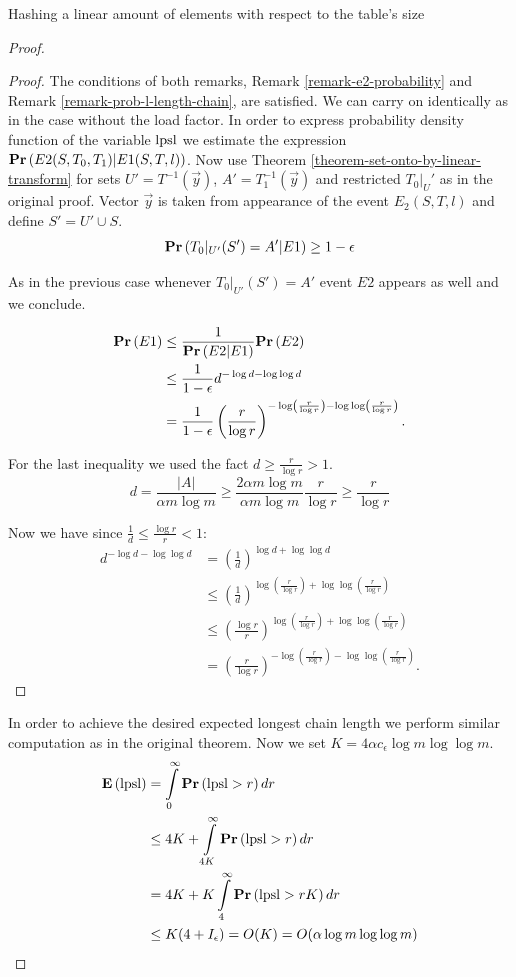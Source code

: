 \begin{section}{Hashing a linear amount of elements with respect to the table's size}
\begin{proof}
\begin{proof}
The conditions of both remarks, Remark \ref{remark-e2-probability} and Remark \ref{remark-prob-l-length-chain}, are satisfied. We can carry on identically as in the case without the load factor. In order to express probability density function of the variable $\mathrm{lpsl}$ we estimate the expression $\mathbf{Pr}\left(E2(S, T_0, T_1)|E1(S, T, l)\right)$. Now use Theorem \ref{theorem-set-onto-by-linear-transform} for sets $U' = T^{-1}(\vec{y})$, $A' = T_1^{-1}(\vec{y})$ and restricted $T_0|_U'$ as in the original proof. Vector $\vec{y}$ is taken from appearance of the event $E_2(S, T, l)$ and define $S' = U' \cup S$.
\[
	\mathbf{Pr}\left(T_0|_{U'}(S') = A' | E1\right) \geq 1 - \epsilon
\]

As in the previous case whenever $T_0|_{U'}(S') = A'$ event $E2$ appears as well and we conclude.

\[
\begin{split}
\mathbf{Pr}\left(E1\right) 
	& \leq \frac{1}{\mathbf{Pr}\left(E2|E1\right)}{\mathbf{Pr}\left(E2\right)} \\
	& \leq \frac{1}{1 - \epsilon} d ^ {-\log d - \log \log d} \\
	& = \frac{1}{1 - \epsilon} \left(\frac{r}{\log r}\right)^{-\log \left(\frac{r}{\log r}\right) - \log \log \left(\frac{r}{\log r}\right)} \text{.}
\end{split}
\]

For the last inequality we used the fact $d \geq \frac{r}{\log r} > 1$.
\[
	d = \frac{|A|}{\alpha m \log m} \geq \frac{2 \alpha m \log m}{\alpha m \log m} \frac{r}{\log r} \geq \frac{r}{\log r}
\]

Now we have since $\frac{1}{d} \leq \frac{\log r}{r} < 1$:
\[
\begin{split}
d ^ {-\log d - \log \log d} 
	& = \left(\frac{1}{d}\right) ^ {\log d + \log \log d} \\
	& \leq \left(\frac{1}{d}\right) ^ {\log \left(\frac{r}{\log r}\right) + \log \log
 \left(\frac{r}{\log r}\right)} \\
	& \leq \left(\frac{\log r}{r}\right) ^ {\log \left(\frac{r}{\log r}\right) + \log \log
 \left(\frac{r}{\log r}\right)} \\
	& = \left(\frac{r}{\log r}\right)^{-\log \left(\frac{r}{\log r}\right) - \log \log \left(\frac{r}{\log r}\right)} \text{.}
\end{split}
\]
\end{proof}

In order to achieve the desired expected longest chain length we perform similar computation as in the original theorem. Now we set $K = 4 \alpha c_\epsilon \log m \log \log m$.
\[
\begin{split}
\mathbf{E}\left(\mathrm{lpsl}\right)
	& = \int\limits_0^\infty \mathbf{Pr}\left(\mathrm{lpsl} > r\right) dr \\
	& \leq 4K + \int\limits_{4K}^\infty \mathbf{Pr}\left(\mathrm{lpsl} > r\right) dr \\
	& = 4K + K\int\limits_4^\infty \mathbf{Pr}\left(\mathrm{lpsl} > rK\right) dr \\
	& \leq K(4 + I_\epsilon) = O(K) = O(\alpha \log m \log \log m)
\end{split}
\]
\end{proof}
\end{section}
